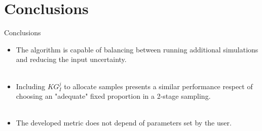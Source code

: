 \documentclass{beamer}
\begin{document}
\section{Conclusions}
\begin{frame}{Conclusions}
	\begin{itemize}
		\item  The algorithm is capable of balancing between running additional simulations and reducing the input uncertainty.\\~\\
		\item Including $KG_{I}^{j}$ to allocate samples presents a similar performance respect of choosing an "adequate" fixed proportion in a 2-stage sampling.\\~\\
		\item The developed metric does not depend of parameters set by the user.\\~\\
	\end{itemize}
\end{frame}
\end{document}
